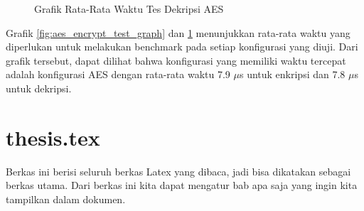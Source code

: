\begin{figure}
    \centering
    \caption{Grafik Rata-Rata Waktu Tes Dekripsi AES}
    \label{fig:aes_decrypt_test_graph}
\end{figure}

Grafik \ref{fig:aes_encrypt_test_graph} dan \ref{fig:aes_decrypt_test_graph} menunjukkan rata-rata waktu yang diperlukan untuk melakukan benchmark pada setiap konfigurasi yang diuji. Dari grafik tersebut, dapat dilihat bahwa konfigurasi yang memiliki waktu tercepat adalah konfigurasi AES dengan rata-rata waktu 7.9 $\mu$s untuk enkripsi dan 7.8 $\mu$s untuk dekripsi.

\iffalse

    \section{thesis.tex}
    Berkas ini berisi seluruh berkas Latex yang dibaca, jadi bisa dikatakan sebagai
    berkas utama. Dari berkas ini kita dapat mengatur bab apa saja yang ingin
    kita tampilkan dalam dokumen.


